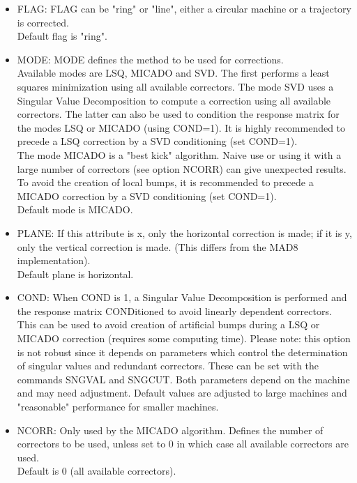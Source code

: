 \begin{itemize}
   \item FLAG: FLAG can be "ring" or "line", either a circular machine or a trajectory is corrected.  
     \\ Default flag is "ring". 

   \item MODE: MODE defines the method to be used for corrections. 
     \\ Available modes are LSQ, MICADO and SVD.  The first performs a
     least squares minimization using all available correctors. The mode
     SVD uses a Singular Value Decomposition to compute a correction
     using all available correctors. The latter can also be used to
     condition the response matrix for the modes LSQ or MICADO (using
     COND=1). It is highly recommended to precede a LSQ correction by a
     SVD conditioning (set COND=1).  
     \\ The mode MICADO is a "best kick" algorithm. Naive use or using
     it with a large number of correctors (see option NCORR) can give
     unexpected results. To avoid the creation of local bumps, it is
     recommended to precede a MICADO correction by a SVD conditioning
     (set COND=1).  
     \\ Default mode is MICADO.            

   \item PLANE: If this attribute is x, only the horizontal correction
     is made; if it is y, only the vertical correction is made. (This
     differs from the MAD8 implementation).  
     \\ Default plane is horizontal. 

   \item COND: When COND is 1, a Singular Value Decomposition is
     performed and  the response matrix CONDitioned to avoid linearly
     dependent correctors. This can be used to avoid creation of
     artificial bumps during a LSQ or MICADO correction (requires some
     computing time).  Please note: this option is not robust since it
     depends on parameters which control the determination of singular
     values and redundant correctors. These can be set with the commands
     SNGVAL and SNGCUT. Both parameters depend on the machine and may
     need adjustment. Default values are adjusted to large machines and
     "reasonable" performance for smaller machines.  
     \\

   \item NCORR: Only used by the MICADO algorithm. Defines the number of
     correctors to be used, unless set to 0 in which case all available
     correctors are used.  
     \\ Default is 0 (all available correctors). 


\end{itemize}
